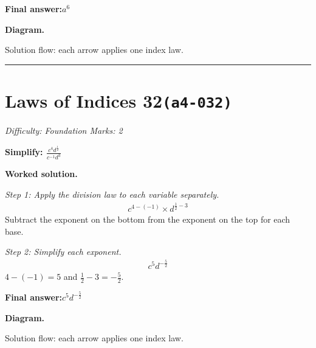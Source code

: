 \documentclass[11pt]{article}
\newcommand{\question}[1]{\par\medskip\noindent\textbf{#1}\par}
\begin{document}
\begin{answerbox}
\textbf{Final answer:}\quad \(\displaystyle a^6\)
\end{answerbox}
\textbf{Diagram.}

\begin{center}
\end{center}
\small Solution flow: each arrow applies one index law.\normalsize

\medskip\hrule

\section*{Laws of Indices 32\quad\small\texttt{(a4-032)}}
\textit{Difficulty: Foundation \quad\textbar\quad Marks: 2}

\question{Simplify: \( \frac{c^4 d^{\frac{1}{2}}}{c^{-1} d^3} \)}

\textbf{Worked solution.}

\textit{Step 1: Apply the division law to each variable separately.}
\[\begin{gathered}
c^{4-(-1)} \times d^{\frac{1}{2}-3}
\end{gathered}\]
Subtract the exponent on the bottom from the exponent on the top for each base.

\textit{Step 2: Simplify each exponent.}
\[\begin{gathered}
c^{5} d^{-\frac{5}{2}}
\end{gathered}\]
\( 4 - (-1) = 5 \) and \( \frac{1}{2} - 3 = -\frac{5}{2} \).

\begin{answerbox}
\textbf{Final answer:}\quad \(\displaystyle c^{5} d^{-\frac{5}{2}}\)
\end{answerbox}
\textbf{Diagram.}

\begin{center}
\end{center}
\small Solution flow: each arrow applies one index law.\normalsize
\end{document}
